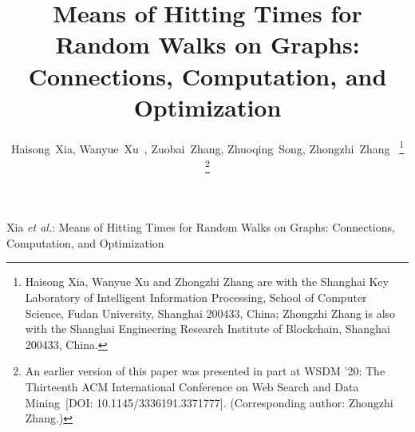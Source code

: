 \documentclass[10pt,twocolumn,twoside]{IEEEtran}
\begin{document}
\title{Means of Hitting Times for Random Walks on Graphs: Connections, Computation, and Optimization}
\author{Haisong~Xia,
    Wanyue~Xu~,
    Zuobai~Zhang,
    Zhuoqing~Song,
    Zhongzhi~Zhang~
    \thanks{
        Haisong Xia, Wanyue Xu and Zhongzhi Zhang are with the Shanghai Key Laboratory of Intelligent Information Processing, School of Computer Science, Fudan University, Shanghai 200433, China;
        Zhongzhi Zhang is also with the Shanghai Engineering Research Institute of Blockchain, Shanghai 200433, China.
    }

    \thanks{
        An earlier version of this paper was presented in part at WSDM '20: The Thirteenth ACM International Conference on Web Search and Data Mining~\cite{ZhXuZh20}[DOI: 10.1145/3336191.3371777]. (Corresponding author: Zhongzhi Zhang.)
    }
}

{Xia \MakeLowercase{\textit{et al.}}: Means of Hitting Times for Random Walks on Graphs: Connections, Computation, and Optimization}
\end{document}
